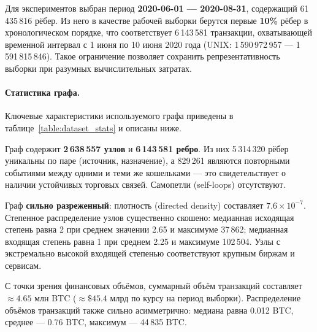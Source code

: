 \documentclass[a4paper,12pt]{extarticle}
\begin{document}
Для экспериментов выбран период \textbf{2020-06-01 --- 2020-08-31}, содержащий 61\,435\,816 рёбер. Из него в качестве рабочей выборки берутся первые \textbf{10\%} рёбер в хронологическом порядке, что соответствует 6\,143\,581 транзакции, охватывающей временной интервал с 1 июня по 10 июня 2020 года (UNIX: 1\,590\,972\,957 --- 1\,591\,815\,846). Такое ограничение позволяет сохранить репрезентативность выборки при разумных вычислительных затратах.

\paragraph{Статистика графа.}
Ключевые характеристики используемого графа приведены в таблице~\ref{table:dataset_stats} и описаны ниже.

Граф содержит \textbf{2\,638\,557 узлов} и \textbf{6\,143\,581 ребро}. Из них 5\,314\,320 рёбер уникальны по паре (источник, назначение), а 829\,261 являются повторными событиями между одними и теми же кошельками --- это свидетельствует о наличии устойчивых торговых связей. Самопетли (self-loops) отсутствуют.

Граф \textbf{сильно разреженный}: плотность (directed density) составляет $7.6 \times 10^{-7}$. Степенное распределение узлов существенно скошено: медианная исходящая степень равна 2 при среднем значении 2.65 и максимуме 37\,862; медианная входящая степень равна 1 при среднем 2.25 и максимуме 102\,504. Узлы с экстремально высокой входящей степенью соответствуют крупным биржам и сервисам.

С точки зрения финансовых объёмов, суммарный объём транзакций составляет $\approx 4.65$ млн BTC ($\approx \$45.4$ млрд по курсу на период выборки). Распределение объёмов транзакций также сильно асимметрично: медиана равна 0.012 BTC, среднее --- 0.76 BTC, максимум --- 44\,835 BTC.
\end{document}
